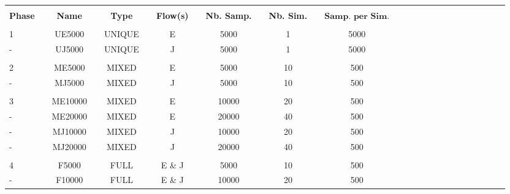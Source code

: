 \bgroup
\def\arraystretch{1.5}
\begin{table}[!b]
\hspace{-0.8cm}
\begin{tabular}{llclclclclclclclclclclclcl}
\Xhline{1.5pt}\\[-1.5em]
\textbf{Phase} &  & \textbf{Name} &  & \textbf{Type} &  & \textbf{Flow(s)} &  & \textbf{Nb. Samp.} &  & \textbf{Nb. Sim.} &  & $\textbf{Samp. per Sim.}$ \\[0.4em] 
\cline{1-1} \cline{3-3} \cline{5-5} \cline{7-7} \cline{9-9} \cline{11-11} \cline{13-13} \\[-1.4em]
1           &  &  UE5000   &  & UNIQUE        &  & E                &  & 5000                 &  & 1              &  & 5000            \\ \rowcolor{Gray}
-     		&  &  UJ5000   &  & UNIQUE        &  & J                &  & 5000                 &  & 1              &  & 5000            \\ 
\hline \\[-1.6em]
2           &  &  ME5000   &  & MIXED         &  & E                &  & 5000                 &  & 10              &  & 500            \\ \rowcolor{Gray}
-     		&  &  MJ5000   &  & MIXED         &  & J                &  & 5000                 &  & 10              &  & 500            \\ 
\hline \\[-1.6em]
3           &  &  ME10000  &  & MIXED         &  & E                &  & 10000                &  & 20              &  & 500             \\ \rowcolor{Gray}
-           &  &  ME20000  &  & MIXED         &  & E                &  & 20000                &  & 40              &  & 500             \\ 
-           &  &  MJ10000  &  & MIXED         &  & J                &  & 10000                &  & 20              &  & 500             \\ \rowcolor{Gray}
-           &  &  MJ20000  &  & MIXED         &  & J                &  & 20000                &  & 40              &  & 500             \\ 
\hline \\[-1.6em]
4           &  &  F5000    &  & FULL          &  & E \& J           &  & 5000                 &  & 10              &  & 500             \\ \rowcolor{Gray}
-           &  &  F10000   &  & FULL          &  & E \& J           &  & 10000                &  & 20              &  & 500            \\ 

\end{tabular}
\end{table}
